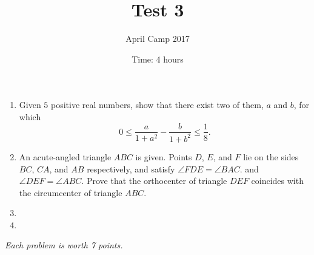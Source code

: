 \documentclass[a4paper,12pt]{article}
\title{Test 3}
\date{Time: 4 hours}
\author{April Camp 2017}
\begin{document}
 \maketitle

\begin{enumerate}
	\item %
        Given $5$ positive real numbers, show that there exist two of them,
        $a$ and $b$, for which
        \[
            0 \leq \frac{a}{1+a^2} - \frac{b}{1+b^2} \leq \frac{1}{8}.
        \]

	\item %
        An acute-angled triangle $ABC$ is given. Points $D$, $E$, and $F$ lie
        on the sides $BC$, $CA$, and $AB$ respectively, and satisfy $\angle
        FDE = \angle BAC$. and $\angle DEF = \angle ABC$. Prove that the
        orthocenter of triangle $DEF$ coincides with the circumcenter of
        triangle $ABC$.

	\item 

	\item 

\end{enumerate}

\medskip 

\hfill \emph{Each problem is worth 7 points.}
	
\end{document}
